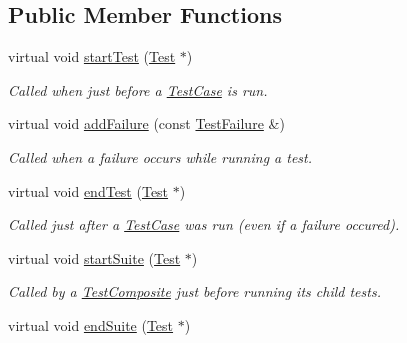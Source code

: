 \subsection*{Public Member Functions}
\begin{DoxyCompactItemize}
\item 
virtual void \hyperlink{class_test_listener_a5546d4420e7412234915113b1ea5ad77}{start\+Test} (\hyperlink{class_test}{Test} $\ast$)\hypertarget{class_test_listener_a5546d4420e7412234915113b1ea5ad77}{}\label{class_test_listener_a5546d4420e7412234915113b1ea5ad77}

\begin{DoxyCompactList}\small\item\em Called when just before a \hyperlink{class_test_case}{Test\+Case} is run. \end{DoxyCompactList}\item 
virtual void \hyperlink{class_test_listener_a103216a5814c907f7b752b969477e765}{add\+Failure} (const \hyperlink{class_test_failure}{Test\+Failure} \&)
\begin{DoxyCompactList}\small\item\em Called when a failure occurs while running a test. \end{DoxyCompactList}\item 
virtual void \hyperlink{class_test_listener_ae8ccd0f55dd9aa7eafded05ba14f9ac6}{end\+Test} (\hyperlink{class_test}{Test} $\ast$)\hypertarget{class_test_listener_ae8ccd0f55dd9aa7eafded05ba14f9ac6}{}\label{class_test_listener_ae8ccd0f55dd9aa7eafded05ba14f9ac6}

\begin{DoxyCompactList}\small\item\em Called just after a \hyperlink{class_test_case}{Test\+Case} was run (even if a failure occured). \end{DoxyCompactList}\item 
virtual void \hyperlink{class_test_listener_a2360ebfccfa39f75bdc43948d5d1d2e7}{start\+Suite} (\hyperlink{class_test}{Test} $\ast$)\hypertarget{class_test_listener_a2360ebfccfa39f75bdc43948d5d1d2e7}{}\label{class_test_listener_a2360ebfccfa39f75bdc43948d5d1d2e7}

\begin{DoxyCompactList}\small\item\em Called by a \hyperlink{class_test_composite}{Test\+Composite} just before running its child tests. \end{DoxyCompactList}\item 
virtual void \hyperlink{class_test_listener_ad49e5589681732a1faff8fca5cbe61f5}{end\+Suite} (\hyperlink{class_test}{Test} $\ast$)\hypertarget{class_test_listener_ad49e5589681732a1faff8fca5cbe61f5}{}\label{class_test_listener_ad49e5589681732a1faff8fca5cbe61f5}


\end{DoxyCompactItemize}
